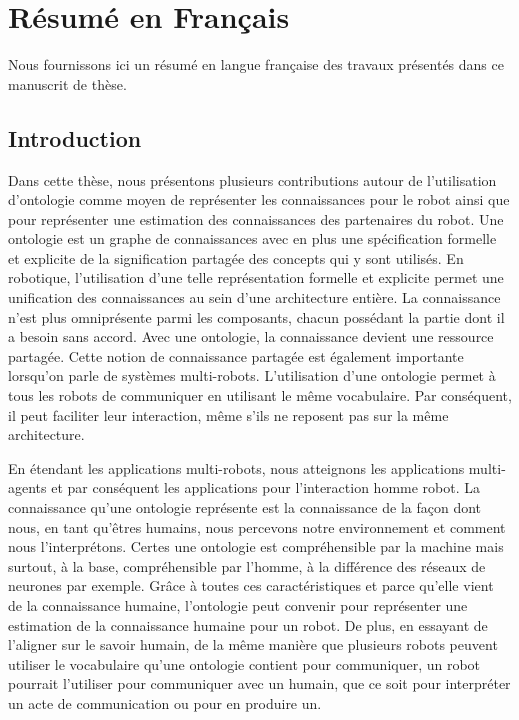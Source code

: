 \chapter{Résumé en Français}
\label{app:fr_small}

Nous fournissons ici un résumé en langue française des travaux présentés dans ce manuscrit de thèse.

\section*{Introduction}

Dans cette thèse, nous présentons plusieurs contributions autour de l'utilisation d'ontologie comme moyen de représenter les connaissances pour le robot ainsi que pour représenter une estimation des connaissances des partenaires du robot. Une ontologie est un graphe de connaissances avec en plus une spécification formelle et explicite de la signification partagée des concepts qui y sont utilisés. En robotique, l'utilisation d'une telle représentation formelle et explicite permet une unification des connaissances au sein d'une architecture entière. La connaissance n'est plus omniprésente parmi les composants, chacun possédant la partie dont il a besoin sans accord. Avec une ontologie, la connaissance devient une ressource partagée. Cette notion de connaissance partagée est également importante lorsqu'on parle de systèmes multi-robots. L'utilisation d'une ontologie permet à tous les robots de communiquer en utilisant le même vocabulaire. Par conséquent, il peut faciliter leur interaction, même s'ils ne reposent pas sur la même architecture.

En étendant les applications multi-robots, nous atteignons les applications multi-agents et par conséquent les applications pour l'interaction homme robot. La connaissance qu'une ontologie représente est la connaissance de la façon dont nous, en tant qu'êtres humains, nous percevons notre environnement et comment nous l'interprétons. Certes une ontologie est compréhensible par la machine mais surtout, à la base, compréhensible par l'homme, à la différence des réseaux de neurones par exemple. Grâce à toutes ces caractéristiques et parce qu'elle vient de la connaissance humaine, l'ontologie peut convenir pour représenter une estimation de la connaissance humaine pour un robot. De plus, en essayant de l'aligner sur le savoir humain, de la même manière que plusieurs robots peuvent utiliser le vocabulaire qu'une ontologie contient pour communiquer, un robot pourrait l'utiliser pour communiquer avec un humain, que ce soit pour interpréter un acte de communication ou pour en produire un. 

